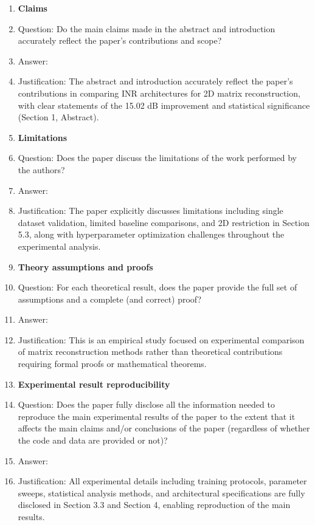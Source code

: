 \documentclass{article}
\begin{document}
\begin{enumerate}

\item {\bf Claims}
    \item[] Question: Do the main claims made in the abstract and introduction accurately reflect the paper's contributions and scope?
    \item[] Answer: \answerYes{}
    \item[] Justification: The abstract and introduction accurately reflect the paper's contributions in comparing INR architectures for 2D matrix reconstruction, with clear statements of the 15.02 dB improvement and statistical significance (Section 1, Abstract).

\item {\bf Limitations}
    \item[] Question: Does the paper discuss the limitations of the work performed by the authors?
    \item[] Answer: \answerYes{}
    \item[] Justification: The paper explicitly discusses limitations including single dataset validation, limited baseline comparisons, and 2D restriction in Section 5.3, along with hyperparameter optimization challenges throughout the experimental analysis.

\item {\bf Theory assumptions and proofs}
    \item[] Question: For each theoretical result, does the paper provide the full set of assumptions and a complete (and correct) proof?
    \item[] Answer: \answerNA{}
    \item[] Justification: This is an empirical study focused on experimental comparison of matrix reconstruction methods rather than theoretical contributions requiring formal proofs or mathematical theorems.

\item {\bf Experimental result reproducibility}
    \item[] Question: Does the paper fully disclose all the information needed to reproduce the main experimental results of the paper to the extent that it affects the main claims and/or conclusions of the paper (regardless of whether the code and data are provided or not)?
    \item[] Answer: \answerYes{}
    \item[] Justification: All experimental details including training protocols, parameter sweeps, statistical analysis methods, and architectural specifications are fully disclosed in Section 3.3 and Section 4, enabling reproduction of the main results.


\end{enumerate}
\end{document}
